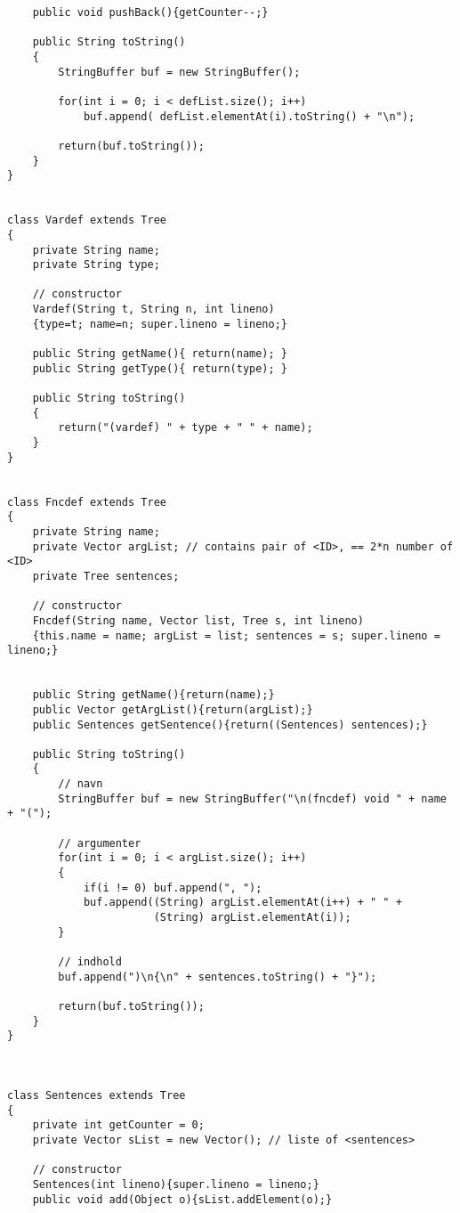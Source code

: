 \begin{footnotesize}
\begin{verbatim}
    public void pushBack(){getCounter--;}

    public String toString()
    {
        StringBuffer buf = new StringBuffer();
        
        for(int i = 0; i < defList.size(); i++)
            buf.append( defList.elementAt(i).toString() + "\n");
        
        return(buf.toString());
    }
}


class Vardef extends Tree
{
    private String name;
    private String type;

    // constructor
    Vardef(String t, String n, int lineno)
    {type=t; name=n; super.lineno = lineno;}

    public String getName(){ return(name); }
    public String getType(){ return(type); }
            
    public String toString()
    {
        return("(vardef) " + type + " " + name);    
    }
}


class Fncdef extends Tree
{
    private String name;
    private Vector argList; // contains pair of <ID>, == 2*n number of <ID>
    private Tree sentences;

    // constructor
    Fncdef(String name, Vector list, Tree s, int lineno)
    {this.name = name; argList = list; sentences = s; super.lineno = lineno;}
            
            
    public String getName(){return(name);}
    public Vector getArgList(){return(argList);}
    public Sentences getSentence(){return((Sentences) sentences);}
    
    public String toString()
    {
        // navn
        StringBuffer buf = new StringBuffer("\n(fncdef) void " + name + "(");
        
        // argumenter
        for(int i = 0; i < argList.size(); i++)
        {
            if(i != 0) buf.append(", ");
            buf.append((String) argList.elementAt(i++) + " " + 
                       (String) argList.elementAt(i));
        }
    
        // indhold
        buf.append(")\n{\n" + sentences.toString() + "}");
    
        return(buf.toString());    
    }
}



class Sentences extends Tree
{
    private int getCounter = 0;
    private Vector sList = new Vector(); // liste of <sentences>
    
    // constructor
    Sentences(int lineno){super.lineno = lineno;}
    public void add(Object o){sList.addElement(o);}
    

\end{verbatim}
\end{footnotesize}
